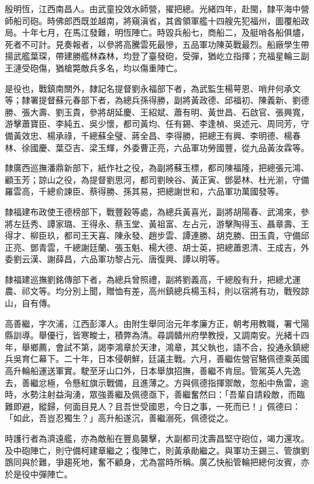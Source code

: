 \begin{pinyinscope}
殷明恆，江西南昌人。由武童投效水師營，擢把總。光緒四年，赴閩，隸平海中營師船司砲。時佛郎西既並越南，將窺滇省，其酋領軍艦十四艘先犯福州，圖覆船政局。十年七月，在馬江發難，明恆陣亡。時毀兵船七，商船二，及艇哨各船俱燼，死者不可計。見奏報者，以參將高騰雲死最慘，五品軍功陳英戰最烈。船廠學生帶揚武艦葉琛，帶建勝艦林森林，均登了臺發砲，受彈，猶屹立指揮；充福星輪三副王漣受砲傷，猶槍斃敵兵多名，均以傷重陣亡。

是役也，戰鎮南關外，隸記名提督劉永福部下者，為武監生楊萼恩、哨弁何承文等；隸署提督蘇元春部下者，為總兵孫得勝，副將黃政德、邱福初、陳義新、劉德勝、張大壽、劉玉貴，參將胡延慶、王紹斌、蕭有明、黃世昌、石啟官、張興寬，游擊蕭寶臣、李純五、吳少懷，都司黃均、任有錫、李逢楨、吳述元、周同芳，守備黃效忠、楊承祿，千總蘇全璧、蔣全昌、李得勝，把總王有興、李明德、楊春林、徐國慶、葉亞吉、梁玉輝，外委曹正亮，六品軍功勞國豐，從九品黃汝霖等。

隸廣西巡撫潘鼎新部下，紙作社之役，為副將蘇玉標，都司陳福隆，把總張元鴻、顧玉芳；諒山之役，為提督劉思河，都司劉映谷、黃正寅、鄧晏林、杜光湔，守備羅雲高，千總俞諫臣、蔡得勝、孫其易，把總謝世和，六品軍功萬國發等。

隸福建布政使王德榜部下，戰豐穀等處，為總兵黃喜光，副將胡陽春、武鴻來，參將左廷秀、譚家璐、王得永、蔡玉堂、黃祖富、左占元，游擊陶得玉、聶章壽、王得才、柳臣玖，都司王天喜、陳永發、趙步雲、譚連勝、胡克勝、田玉貴，守備邱正亮、鄧青雲，千總謝廷蘭、張玉魁、楊大德、胡士英，把總蕭恩清、王成吉，外委劉云漢、謝薛昌，六品軍功黎占元、唐復興、譚以明等。

隸福建巡撫劉銘傳部下者，為總兵曾照禮，副將劉義高，千總殷有升，把總尤運農、祁文等。均分別上聞，贈恤有差，高州鎮總兵楊玉科，則以宿將有功，戰歿諒山，自有傳。

高善繼，字次浦，江西彭澤人。由附生舉同治元年孝廉方正，朝考用教職，署弋陽縣訓導。舉優行，皆寒畯士，積弊為清。尋調贛州府學教授，又調南安。光緒十四年，舉鄉薦，會試不第，謁李鴻章於天津，鴻章，其父執也，語不合，投通永鎮總兵吳育仁幕下。二十年，日本侵朝鮮，廷議主戰。六月，善繼佐營官駱佩德乘英國高升輪船運送軍實。駛至牙山口外，日本舉旗招撫，善繼不肯屈。管駕英人先逸去，善繼忿極，令懸紅旗示戰備，且進薄之。方與佩德指揮禦敵，忽船中魚雷，逾時，水勢注射益洶湧，眾強善繼及佩德亟下，善繼奮然曰：「吾輩自請殺敵，而臨難即避，縱歸，何面目見人？且吾世受國恩，今日之事，一死而已！」佩德曰：「如此，吾豈忍獨生？」高升船遂沉，善繼溺死，佩德從之。

時護行者為濟遠艦，亦為敵船在豐島襲擊，大副都司沈壽昌堅守砲位，竭力還攻。及中砲陣亡，則守備柯建章繼之；復陣亡，則黃承勛繼之。與軍功王錫三、管旗劉鵾同與於難，爭趨死地，奮不顧身，尤為當時所稱。廣乙快船管輪把總何汝賓，亦於是役中彈陣亡。


\end{pinyinscope}
